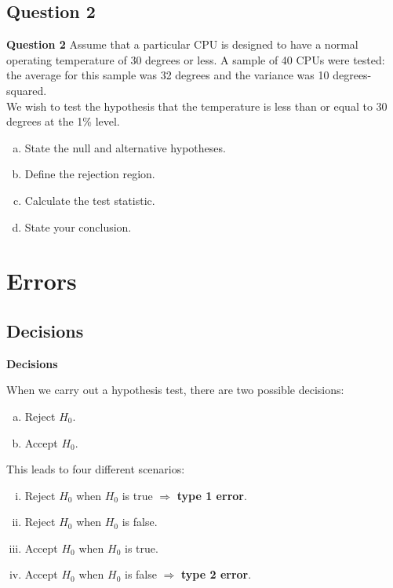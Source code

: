 \documentclass[compress]{beamer}        %
\makeatletter
\newcommand{\tcb}{\textcolor{beamer@blendedblue}}
\makeatother
\begin{document}
\subsection{Question 2}
\begin{frame}{\bf \tcb{Question 2}}
Assume that a particular CPU is designed to have a normal operating temperature of 30 degrees or less. A sample of 40 CPUs were tested: the average for this sample was 32 degrees and the variance was 10 degrees-squared.\\[0.5cm]

We wish to test the hypothesis that the temperature is less than or equal to 30 degrees at the 1\% level.\\[0.2cm]
\begin{enumerate}[a)]\itemsep0.3cm
\item State the null and alternative hypotheses.
\item Define the rejection region.
\item Calculate the test statistic.
\item State your conclusion.
\end{enumerate}

\end{frame}





\section{Errors}
\subsection{Decisions}
\begin{frame}{\bf \tcb{Decisions}}

When we carry out a hypothesis test, there are two possible decisions:\\[0.1cm]
\begin{enumerate}[a)]\itemsep0.3cm
\item Reject $H_0$.
\item Accept $H_0$.\\[0.8cm]
\end{enumerate}

This leads to four different scenarios:\\[0.1cm]
\begin{enumerate}[i)]\itemsep0.3cm
\item Reject $H_0$ when $H_0$ is true $\Rightarrow$ {\bf type 1 error}.
\item Reject $H_0$ when $H_0$ is false.
\item Accept $H_0$ when $H_0$ is true.
\item Accept $H_0$ when $H_0$ is false  $\Rightarrow$  {\bf type 2 error}.
\end{enumerate}


\end{frame}
\end{document}
